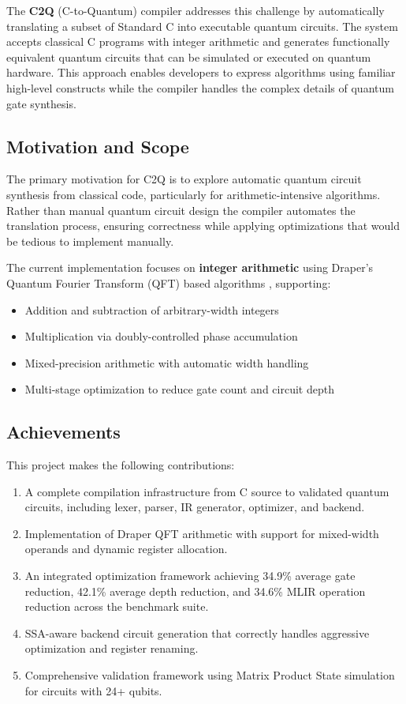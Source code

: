 \documentclass[a4paper,twocolumn]{article}
\begin{document}
The \textbf{C2Q} (C-to-Quantum) compiler addresses this challenge by automatically translating a subset of Standard C
into executable quantum circuits. The system accepts classical C programs with integer arithmetic and generates functionally
equivalent quantum circuits that can be simulated or executed on quantum hardware. This approach enables developers to express
algorithms using familiar high-level constructs while the compiler handles the complex details of quantum gate synthesis.

\subsection{Motivation and Scope}

The primary motivation for C2Q is to explore automatic quantum circuit synthesis from classical code, particularly
for arithmetic-intensive algorithms. Rather than manual quantum circuit design the compiler automates the translation process, ensuring correctness while applying optimizations
that would be tedious to implement manually.

The current implementation focuses on \textbf{integer arithmetic} using Draper's Quantum Fourier Transform (QFT)
based algorithms \cite{draper2000addition}, supporting:
\begin{itemize}
  \item Addition and subtraction of arbitrary-width integers
  \item Multiplication via doubly-controlled phase accumulation
  \item Mixed-precision arithmetic with automatic width handling
  \item Multi-stage optimization to reduce gate count and circuit depth
\end{itemize}

\subsection{Achievements}

This project makes the following contributions:
\begin{enumerate}
  \item A complete compilation infrastructure from C source to validated quantum circuits, including lexer,
        parser, IR generator, optimizer, and backend.
  \item Implementation of Draper QFT arithmetic with support for mixed-width operands and dynamic register allocation.
  \item An integrated optimization framework achieving 34.9\% average gate reduction, 42.1\% average depth reduction,
        and 34.6\% MLIR operation reduction across the benchmark suite.
  \item SSA-aware backend circuit generation that correctly handles aggressive optimization and register renaming.
  \item Comprehensive validation framework using Matrix Product State simulation for circuits with 24+ qubits.
\end{enumerate}
\end{document}
